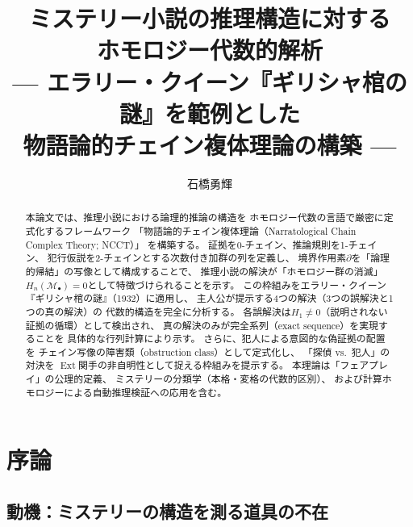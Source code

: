 \documentclass[12pt,twocolumn]{ltjsarticle}
\newcommand{\Ext}{\operatorname{Ext}}
\newcommand{\Mys}{\mathcal{M}}
\begin{document}
\title{
  \textbf{ミステリー小説の推理構造に対する}\\[2pt]
  \textbf{ホモロジー代数的解析}\\[8pt]
  {\normalsize --- エラリー・クイーン『ギリシャ棺の謎』を範例とした}\\[2pt]
  {\normalsize 物語論的チェイン複体理論の構築 ---}
}

\author{
  石橋勇輝
}

\date{}

\maketitle

\begin{abstract}
\noindent
本論文では、推理小説における論理的推論の構造を
ホモロジー代数の言語で厳密に定式化するフレームワーク
「物語論的チェイン複体理論（Narratological Chain Complex Theory; NCCT）」
を構築する。
証拠を0-チェイン、推論規則を1-チェイン、
犯行仮説を2-チェインとする次数付き加群の列を定義し、
境界作用素$\partial$を「論理的帰結」の写像として構成することで、
推理小説の解決が「ホモロジー群の消滅」
$H_n(\Mys_\bullet) = 0$として特徴づけられることを示す。
この枠組みをエラリー・クイーン『ギリシャ棺の謎』（1932）に適用し、
主人公が提示する4つの解決（3つの誤解決と1つの真の解決）の
代数的構造を完全に分析する。
各誤解決は$H_1 \neq 0$（説明されない証拠の循環）として検出され、
真の解決のみが完全系列（exact sequence）を実現することを
具体的な行列計算により示す。
さらに、犯人による意図的な偽証拠の配置を
チェイン写像の障害類（obstruction class）として定式化し、
「探偵 vs.\ 犯人」の対決を
$\Ext$関手の非自明性として捉える枠組みを提示する。
本理論は「フェアプレイ」の公理的定義、
ミステリーの分類学（本格・変格の代数的区別）、
および計算ホモロジーによる自動推理検証への応用を含む。
\end{abstract}


\section{序論}

\subsection{動機：ミステリーの構造を測る道具の不在}
\end{document}

